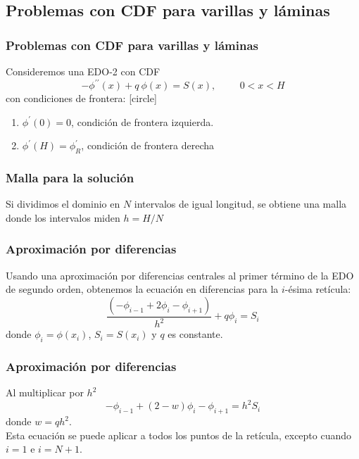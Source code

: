 \subsection{Problemas con CDF para varillas y láminas}
\begin{frame}
\frametitle{Problemas con CDF para varillas y láminas}
Consideremos una EDO-2 con CDF
\[ - \phi^{\prime \prime} (x) + q \: \phi (x) = S(x), \hspace{1cm} 0 < x < H \]
con condiciones de frontera:
[circle]
\begin{enumerate}[<+->]
\item $\phi^{\prime}(0) = 0$, condición de frontera izquierda.
\item $\phi^{\prime}(H) = \phi^{\prime}_{R}$, condición de frontera derecha
\end{enumerate}
\end{frame}
\begin{frame}
\frametitle{Malla para la solución}
Si dividimos el dominio en $N$ intervalos de igual longitud, se obtiene una malla donde los intervalos miden $h = H/N$
\begin{center}
\end{center}
\end{frame}
\begin{frame}
\frametitle{Aproximación por diferencias}
Usando una aproximación por diferencias centrales al primer término de la EDO de segundo orden, obtenemos la ecuación en diferencias para
la $i$-ésima retícula:
\[ \dfrac{(-\phi_{i-1} + 2 \phi_{i} - \phi_{i+1})}{h^{2}} + q \phi_{i} = S_{i} \]
donde $\phi_{i}=\phi(x_{i})$, $S_{i}=S(x_{i})$ y $q$ es constante.
\end{frame}
\begin{frame}
\frametitle{Aproximación por diferencias}
Al multiplicar por $h^{2}$
\[ - \phi_{i-1} + (2-w) \phi_{i} - \phi_{i+1} = h^{2}S_{i} \]
donde $w=qh^{2}$.
\\
\bigskip
Esta ecuación se puede aplicar a todos los puntos de la retícula, excepto cuando $i = 1$ e $i = N+1$.
\end{frame}
